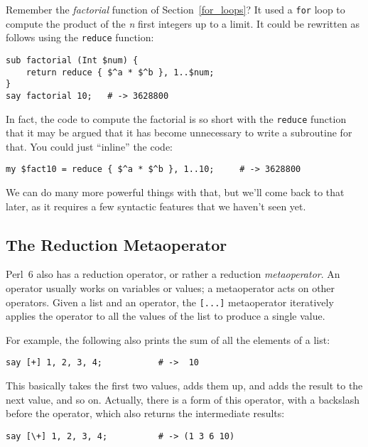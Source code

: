 Remember the \emph{factorial} function of Section~\ref{for_loops}? 
It used a {\tt for} loop to compute the product of the \emph{n} first 
integers up to a limit. It could be rewritten as follows using the 
{\tt reduce} function:

\begin{verbatim}
sub factorial (Int $num) { 
    return reduce { $^a * $^b }, 1..$num;
}
say factorial 10;   # -> 3628800
\end{verbatim}
%
In fact, the code to compute the factorial is so short with 
the {\tt reduce} function that it may be argued that it has 
become unnecessary to write a subroutine for that. You could 
just ``inline'' the code:

\begin{verbatim}
my $fact10 = reduce { $^a * $^b }, 1..10;     # -> 3628800
\end{verbatim}
%

We can do many more powerful things with that, but we'll come 
back to that later, as it requires a few syntactic features that 
we haven't seen yet.

\subsection{The Reduction Metaoperator}

Perl~6 also has a reduction operator, 
or rather a reduction \emph{metaoperator}. An operator 
usually works on variables or values; a metaoperator acts 
on other operators. Given a list and an operator, the 
\verb'[...]' metaoperator iteratively applies the operator 
to all the values of the list to produce a single value.

For example, the following also prints the sum of all the 
elements of a list:

\begin{verbatim}
say [+] 1, 2, 3, 4;           # ->  10
\end{verbatim}

This basically takes the first two values, adds them up, 
and adds the result to the next value, and so on. Actually, 
there is a form of this operator, with a backslash before 
the operator, which also returns the intermediate results:

\begin{verbatim}
say [\+] 1, 2, 3, 4;          # -> (1 3 6 10)
\end{verbatim}

